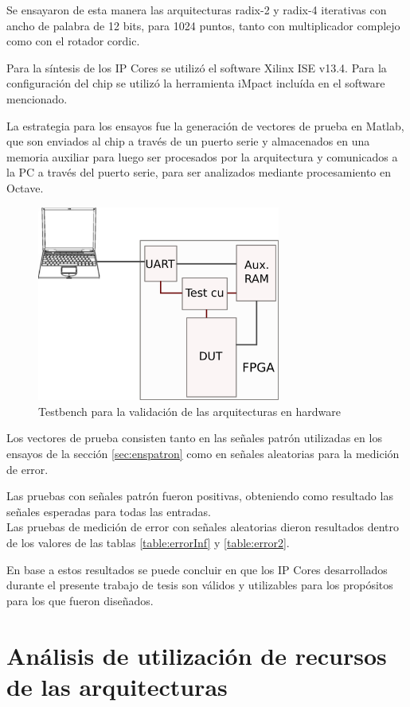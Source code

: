 Se ensayaron de esta manera las arquitecturas radix-2 y radix-4 iterativas con ancho de palabra de
12 bits, para 1024 puntos, tanto con multiplicador complejo como con el rotador cordic.

Para la síntesis de los IP Cores se utilizó el software Xilinx ISE v13.4. Para la configuración del
chip se utilizó la herramienta iMpact incluída en el software mencionado.

La estrategia para los ensayos fue la generación de vectores de prueba en Matlab, que son enviados
al chip a través de un puerto serie y almacenados en una memoria auxiliar para luego ser procesados
por la arquitectura y comunicados a la PC a través del puerto serie, para ser analizados mediante
procesamiento en Octave.

\begin{figure}[htb!]
        \centering
        \includegraphics[width=8cm]{./figures/hw_tb.png}
        \caption{Testbench para la validación de las arquitecturas en hardware}
        \label{fig:hw_tb}
\end{figure}

Los vectores de prueba consisten tanto en las señales patrón utilizadas en los ensayos de
la sección \ref{sec:enspatron} como en señales aleatorias para la medición de error.

Las pruebas con señales patrón fueron positivas, obteniendo como resultado las señales esperadas
para todas las entradas.\\
Las pruebas de medición de error con señales aleatorias dieron resultados dentro de los valores de
las tablas \ref{table:errorInf} y \ref{table:error2}.

En base a estos resultados se puede concluir en que los IP Cores desarrollados durante el presente
trabajo de tesis son válidos y utilizables para los propósitos para los que fueron diseñados.

\section{Análisis de utilización de recursos de las arquitecturas}


